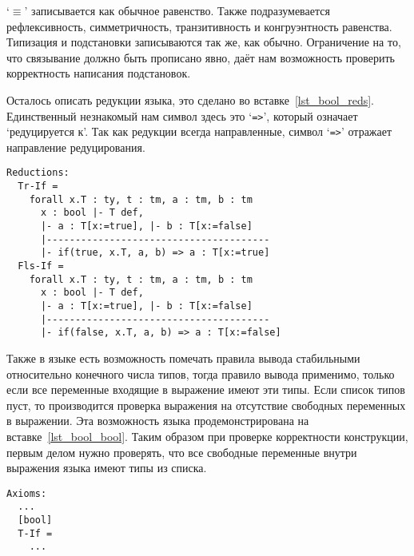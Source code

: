 `$\equiv$' записывается как обычное равенство. Также подразумевается рефлексивность, симметричность, транзитивность и конгруэнтность равенства. Типизация и подстановки записываются так же, как обычно. Ограничение на то, что связывание должно быть прописано явно, даёт нам возможность проверить корректность написания подстановок.

Осталось описать редукции языка, это сделано во вставке~\ref{lst_bool_reds}. Единственный незнакомый нам символ здесь это `\lstinline{=>}', который означает `редуцируется к'. Так как редукции всегда направленные, символ `\lstinline{=>}' отражает направление редуцирования.

\begin{lstlisting}[label={lst_bool_reds}, caption={Редукции языка Bool, описанные в языке спецификации},captionpos=b, frame=single, float]
Reductions:
  Tr-If =
    forall x.T : ty, t : tm, a : tm, b : tm
      x : bool |- T def,
      |- a : T[x:=true], |- b : T[x:=false]
      |---------------------------------------
      |- if(true, x.T, a, b) => a : T[x:=true]
  Fls-If =
    forall x.T : ty, t : tm, a : tm, b : tm
      x : bool |- T def,
      |- a : T[x:=true], |- b : T[x:=false]
      |---------------------------------------
      |- if(false, x.T, a, b) => a : T[x:=false]
\end{lstlisting}

\hfill

Также в языке есть возможность помечать правила вывода стабильными относительно конечного числа типов, тогда правило вывода применимо, только если все переменные входящие в выражение имеют эти типы. Если список типов пуст, то производится проверка выражения на отсутствие свободных переменных в выражении. Эта возможность языка продемонстрирована на вставке~\ref{lst_bool_bool}. Таким образом при проверке корректности конструкции, первым делом нужно проверять, что все свободные переменные внутри выражения языка имеют типы из списка.

\begin{lstlisting}[label={lst_bool_bool}, caption={Bool-стабильность правила вывода `If', описанная в языке спецификации},captionpos=b, frame=single, float]
Axioms:
  ...
  [bool]
  T-If =
    ...
\end{lstlisting}
